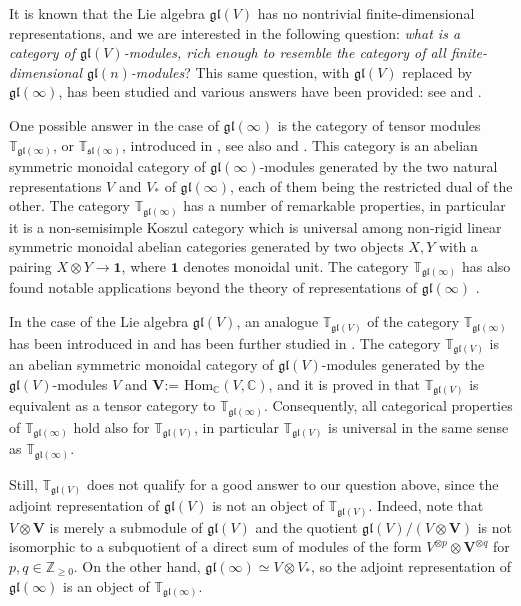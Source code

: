 \documentclass[12pt,reqno]{amsart}
\newcommand{\CC}{\mathbb{C}}
\newcommand{\TT}{\mathbb{T}}
\theoremstyle{definition}
\theoremstyle{remark}
\begin{document}
	It is known that the Lie algebra $ \mathfrak{gl}(V) $ has no nontrivial finite-dimensional representations, and we are interested in the following question: \textit{what is a category of $ \mathfrak{gl}(V) $-modules, rich enough to resemble the category of all finite-dimensional $ \mathfrak{gl}(n) $-modules}? This same question, with $ \mathfrak{gl}(V) $ replaced by $\mathfrak{gl}(\infty)$, has been studied and various answers have been provided: see \cite{Cat} and \cite{PH}.
	
	One possible answer in the case of $ \mathfrak{gl}(\infty) $ is the category of tensor modules $\TT_{\mathfrak{gl}(\infty)}$, or $\TT_{\mathfrak{sl}(\infty)}$, introduced in \cite{DPS}, see also \cite{PStyr} and \cite{SS}. This category is an abelian symmetric monoidal category of $ \mathfrak{gl}(\infty) $-modules generated by the two natural representations $ V $ and $ V_{*} $ of $ \mathfrak{gl}(\infty) $, each of them being the restricted dual of the other. The category $\TT_{\mathfrak{gl}(\infty)}$ has a number of remarkable properties, in particular it is a non-semisimple Koszul category which is universal among non-rigid linear symmetric monoidal abelian categories generated by two objects $ X, Y $ with a pairing $ X\otimes Y\to\mathbf{1} $, where $ \mathbf{1}$ denotes monoidal unit. The category $\TT_{\mathfrak{gl}(\infty)}$ has also found notable applications beyond the theory of representations of $ \mathfrak{gl}(\infty) $ \cite{EHS}.
	
	In the case of the Lie algebra $ \mathfrak{gl}(V) $, an analogue $\TT_{\mathfrak{gl}(V)}$ of the category $\TT_{\mathfrak{gl}(\infty)}$ has been introduced in \cite{Mac} and has been further studied in \cite{C}.  The category $\TT_{\mathfrak{gl}(V)}$ is an abelian symmetric monoidal category of $ \mathfrak{gl}(V) $-modules generated by the $ \mathfrak{gl}(V) $-modules $ V $ and $ \mathbf{V} $:= $ \mathrm{Hom}_{\CC}(V, \CC) $, and it is proved in \cite{C} that $\TT_{\mathfrak{gl}(V)}$ is equivalent as a tensor category to $\TT_{\mathfrak{gl}(\infty)}$. Consequently, all categorical properties of $\TT_{\mathfrak{gl}(\infty)}$ hold also for $\TT_{\mathfrak{gl}(V)}$, in particular $\TT_{\mathfrak{gl}(V)}$ is universal in the same sense as $\TT_{\mathfrak{gl}(\infty)}$. 
	
	Still, $\TT_{\mathfrak{gl}(V)}$ does not qualify for a good answer to our question above, since the adjoint representation of $ \mathfrak{gl}(V) $ is not an object of $\TT_{\mathfrak{gl}(V)}$. Indeed, note that $ V\otimes\mathbf{V} $ is merely a submodule of $ \mathfrak{gl}(V) $ and the quotient $\mathfrak{gl}(V)/(V\otimes\mathbf{V})$ is not isomorphic to a subquotient of a direct sum of modules of the form $V^{\otimes p}\otimes \mathbf{V}^{\otimes q}$ for $p,q\in\mathbb{Z}_{\geq 0}$.
	On the other hand, 
	$\mathfrak{gl}(\infty) \simeq V\otimes V_{*}$, so the adjoint representation of $\mathfrak{gl}(\infty)$ is an object of $\TT_{\mathfrak{gl}(\infty)}$. 
	
\end{document}

